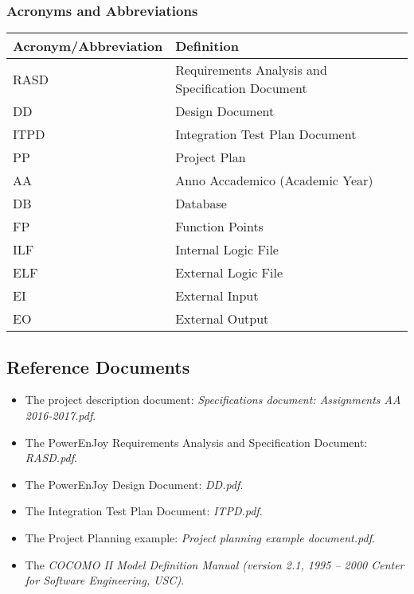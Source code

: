 \subsubsection{Acronyms and Abbreviations}
\begin{center}
	\begin{tabular} { | m{5cm} | m{8cm} | }
		\hline
		\textbf{Acronym/Abbreviation} & \textbf{Definition}\\
		\hline
		RASD & Requirements Analysis and Specification Document\\
		\hline
		DD & Design Document\\
		\hline
		ITPD & Integration Test Plan Document\\
		\hline
		PP & Project Plan\\
		\hline
		AA & Anno Accademico (Academic Year)\\
		\hline
		DB & Database\\
		\hline
		FP & Function Points\\
		\hline
		ILF & Internal Logic File\\
		\hline
		ELF & External Logic File\\
		\hline
		EI & External Input\\
		\hline
		EO & External Output\\
		\hline
	\end{tabular}
\end{center}

\subsection{Reference Documents}
\begin{itemize}
	\item The project description document: \textit{Specifications document: Assignments AA 2016-2017.pdf}.
	\item The PowerEnJoy Requirements Analysis and Specification Document: \textit{RASD.pdf}.
	\item The PowerEnJoy Design Document: \textit{DD.pdf}.
	\item The Integration Test Plan Document: \textit{ITPD.pdf}.
	\item The Project Planning example: \textit{Project planning example document.pdf}.
	\item The \textit{COCOMO II Model Definition Manual (version 2.1, 1995 – 2000 Center for Software Engineering, USC)}.
\end{itemize}